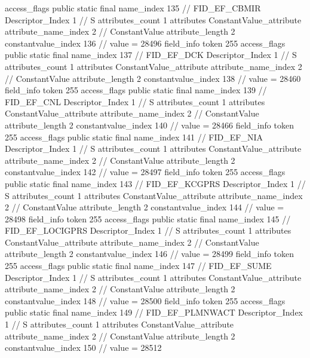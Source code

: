 {{{{{				access_flags	public static final
				name_index	135		// FID_EF_CBMIR
				Descriptor_Index	1		// S
				attributes_count	1
				attributes {
				ConstantValue_attribute {
					attribute_name_index	2		// ConstantValue
					attribute_length	2
					constantvalue_index	136		// value = 28496
				}
				}
			}
			field_info {
				token	255
				access_flags	public static final
				name_index	137		// FID_EF_DCK
				Descriptor_Index	1		// S
				attributes_count	1
				attributes {
				ConstantValue_attribute {
					attribute_name_index	2		// ConstantValue
					attribute_length	2
					constantvalue_index	138		// value = 28460
				}
				}
			}
			field_info {
				token	255
				access_flags	public static final
				name_index	139		// FID_EF_CNL
				Descriptor_Index	1		// S
				attributes_count	1
				attributes {
				ConstantValue_attribute {
					attribute_name_index	2		// ConstantValue
					attribute_length	2
					constantvalue_index	140		// value = 28466
				}
				}
			}
			field_info {
				token	255
				access_flags	public static final
				name_index	141		// FID_EF_NIA
				Descriptor_Index	1		// S
				attributes_count	1
				attributes {
				ConstantValue_attribute {
					attribute_name_index	2		// ConstantValue
					attribute_length	2
					constantvalue_index	142		// value = 28497
				}
				}
			}
			field_info {
				token	255
				access_flags	public static final
				name_index	143		// FID_EF_KCGPRS
				Descriptor_Index	1		// S
				attributes_count	1
				attributes {
				ConstantValue_attribute {
					attribute_name_index	2		// ConstantValue
					attribute_length	2
					constantvalue_index	144		// value = 28498
				}
				}
			}
			field_info {
				token	255
				access_flags	public static final
				name_index	145		// FID_EF_LOCIGPRS
				Descriptor_Index	1		// S
				attributes_count	1
				attributes {
				ConstantValue_attribute {
					attribute_name_index	2		// ConstantValue
					attribute_length	2
					constantvalue_index	146		// value = 28499
				}
				}
			}
			field_info {
				token	255
				access_flags	public static final
				name_index	147		// FID_EF_SUME
				Descriptor_Index	1		// S
				attributes_count	1
				attributes {
				ConstantValue_attribute {
					attribute_name_index	2		// ConstantValue
					attribute_length	2
					constantvalue_index	148		// value = 28500
				}
				}
			}
			field_info {
				token	255
				access_flags	public static final
				name_index	149		// FID_EF_PLMNWACT
				Descriptor_Index	1		// S
				attributes_count	1
				attributes {
				ConstantValue_attribute {
					attribute_name_index	2		// ConstantValue
					attribute_length	2
					constantvalue_index	150		// value = 28512
}}}}}}}

